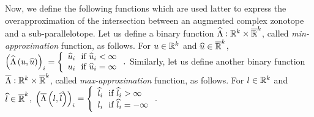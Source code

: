 Now, we define the following functions which are used latter to
express the overapproximation of the intersection between an augmented
complex zonotope and a sub-parallelotope.
%
Let us define a binary function
$\widehat{\Lambda}:\mathbb{R}^k\times\mathbb{\overline{R}}^k$,
called \emph{min-approximation} function, as follows.  For
$u\in\mathbb{R}^k$ and $\widehat{u}\in\mathbb{\overline{R}}^k$,
$\left(\widehat{\Lambda}\left(u,\widehat{u}\right)\right)_i = \left\{
\begin{array}{l}
\widehat{u}_i~~\text{if}~\widehat{u}_i<\infty\\
u_i~~\text{if}~\widehat{u}_i=\infty
\end{array}
\right..$
Similarly, let us define another binary function       
$\overline{\Lambda}:\mathbb{R}^k\times\mathbb{\overline{R}}^k$,
called \emph{max-approximation} function, as follows.  For
$l\in\mathbb{R}^k$ and $\widehat{l}\in\mathbb{\overline{R}}^k$,
$\left(\overline{\Lambda}\left(l,\widehat{l}\right)\right)_i = \left\{
\begin{array}{l}
\widehat{l}_i~~\text{if}~\widehat{l}_i>\infty\\
l_i~~\text{if}~\widehat{l}_i=-\infty
\end{array}
\right..$
%

